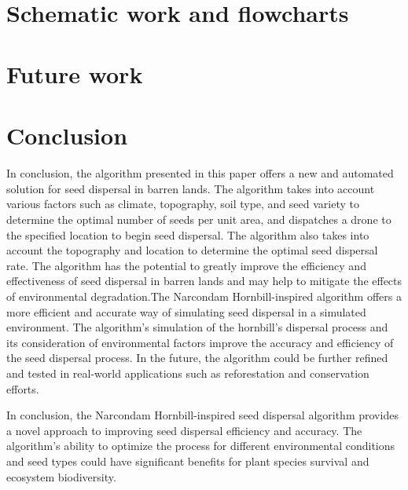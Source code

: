 \documentclass[pmlr,twocolumn,10pt]{jmlr}
\begin{document}
\\
\\
\\
\\
\section*{Schematic work and flowcharts}

\section*{Future work}


\section*{Conclusion}
In conclusion, the algorithm presented in this paper offers a new and automated solution for seed dispersal in barren lands. The algorithm takes into account various factors such as climate, topography, soil type, and seed variety to determine the optimal number of seeds per unit area, and dispatches a drone to the specified location to begin seed dispersal. The algorithm also takes into account the topography and location to determine the optimal seed dispersal rate. The algorithm has the potential to greatly improve the efficiency and effectiveness of seed dispersal in barren lands and may help to mitigate the effects of environmental degradation.The Narcondam Hornbill-inspired algorithm offers a more efficient and accurate way of simulating seed dispersal in a simulated environment. The algorithm's simulation of the hornbill's dispersal process and its consideration of environmental factors improve the accuracy and efficiency of the seed dispersal process. In the future, the algorithm could be further refined and tested in real-world applications such as reforestation and conservation efforts.

In conclusion, the Narcondam Hornbill-inspired seed dispersal algorithm provides a novel approach to improving seed dispersal efficiency and accuracy. The algorithm's ability to optimize the process for different environmental conditions and seed types could have significant benefits for plant species survival and ecosystem biodiversity.
\end{document}
